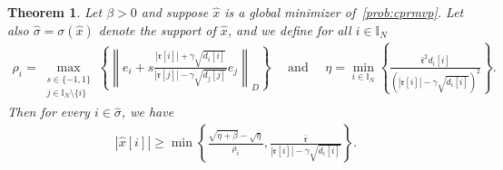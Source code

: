 \documentclass[11pt]{article}
\theoremstyle{plain}
\newtheorem{theorem}{Theorem}
\theoremstyle{definition}
\theoremstyle{plain}
\newcommand{\II}{{\mathbb I}}
\newcommand{\norm}[1]{\left\lVert#1\right\rVert}
\newcommand{\abs}[1]{\left\lvert#1\right\rvert}
\newcommand{\ccr}{{\mathfrak r}}
\begin{document}
\begin{theorem}
\label{thm:lower-bound}
    Let $\beta>0$ and suppose $\hat{x}$ is a global minimizer of~\eqref{prob:cprmvp}. Let also $\hat{\sigma}=\sigma(\hat{x})$ denote the support of $\hat{x}$, and we define for all $i\in\II_N$
    \begin{align*}
        \rho_i=\max_{\substack{s\in\{-1,1\}\\ j\in \II_N\setminus\{i\}}}\left\{\norm{e_i+s\frac{\abs{\ccr[i]}+\gamma\sqrt{d_i[i]}}{\abs{\ccr[j]}-\gamma\sqrt{d_j[j]}}e_j}_D\right\} \quad\text{ and } \quad\eta=\min_{i\in\II_N}\left\{\frac{\bar{\ccr}^2d_i[i]}{(\abs{\ccr[i]}-\gamma\sqrt{d_i[i]})^2}\right\} .
    \end{align*} Then for every $i\in\hat{\sigma}$, we have
    \begin{align*}
    \abs{\hat{x}[i]}\geq \min\left\{\frac{\sqrt{\eta+\beta}-\sqrt{\eta}}{\rho_i},\frac{\bar{\ccr}}{\abs{\ccr[i]}-\gamma\sqrt{d_i[i]}}\right\}.
\end{align*}
\end{theorem}
\end{document}

